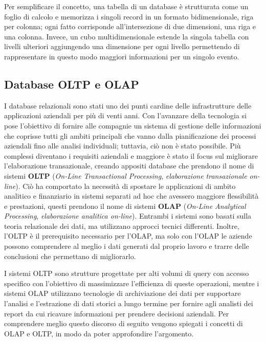 Per semplificare il concetto, una tabella di un database è strutturata come un foglio di calcolo e memorizza i singoli record in un formato bidimensionale, riga per colonna; ogni fatto corrisponde all’intersezione di due dimensioni, una riga e una colonna. Invece, un cubo multidimensionale estende la singola tabella con livelli ulteriori aggiungendo una dimensione per ogni livello permettendo di rappresentare in questo modo maggiori informazioni per un singolo evento.\cite{ibm_multidimensional_data}

\subsection{Database OLTP e OLAP}

I database relazionali sono stati uno dei punti cardine delle infrastrutture delle applicazioni aziendali per più di venti anni. Con l’avanzare della tecnologia si pose l’obiettivo di fornire alle compagnie un sistema di gestione delle informazioni che coprisse tutti gli ambiti principali che vanno dalla pianificazione dei processi aziendali fino alle analisi individuali; tuttavia, ciò non è stato possibile. Più complessi diventano i requisiti aziendali e maggiore è stato il focus sul migliorare l’elaborazione transazionale, creando appositi database che prendono il nome di sistemi \textbf{OLTP} (\textit{On-Line Transactional Processing}, \textit{elaborazione transazionale on-line}). Ciò ha comportato la necessità di spostare le applicazioni di ambito analitico e finanziario in sistemi separati ad hoc che avessero maggiore flessibilità e prestazioni, questi prendono il nome di sistemi \textbf{OLAP} (\textit{On-Line Analytical Processing}, \textit{elaborazione analitica on-line}). Entrambi i sistemi sono basati sulla teoria relazionale dei dati, ma utilizzano approcci tecnici differenti. Inoltre, l’OLTP è il prerequisito necessario per l’OLAP, ma solo con l’OLAP le aziende possono comprendere al meglio i dati generati dal proprio lavoro e trarre delle conclusioni che permettano di migliorarlo.\cite{scribd_oltp_olap}

I sistemi OLTP sono strutture progettate per alti volumi di query con accesso specifico con l’obiettivo di massimizzare l’efficienza di queste operazioni, mentre i sistemi OLAP utilizzano tecnologie di archiviazione dei dati per supportare l’analisi e l’estrazione di dati storici a lungo termine per fornire agli analisti dei report da cui ricavare informazioni per prendere decisioni aziendali.\cite{ieee_oltp_olap}
Per comprendere meglio questo discorso di seguito vengono spiegati i concetti di OLAP e OLTP, in modo da poter approfondire l’argomento.

